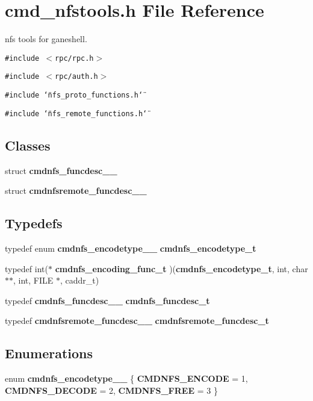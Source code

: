 \section{cmd\_\-nfstools.h File Reference}
\label{cmd__nfstools_8h}
nfs tools for ganeshell. 

{\tt \#include $<$rpc/rpc.h$>$}\par
{\tt \#include $<$rpc/auth.h$>$}\par
{\tt \#include \char`\"{}nfs\_\-proto\_\-functions.h\char`\"{}}\par
{\tt \#include \char`\"{}nfs\_\-remote\_\-functions.h\char`\"{}}\par
\subsection*{Classes}
\begin{CompactItemize}
\item 
struct {\bf cmdnfs\_\-funcdesc\_\-\_\-}
\item 
struct {\bf cmdnfsremote\_\-funcdesc\_\-\_\-}
\end{CompactItemize}
\subsection*{Typedefs}
\begin{CompactItemize}
\item 
typedef enum {\bf cmdnfs\_\-encodetype\_\-\_\-} {\bf cmdnfs\_\-encodetype\_\-t}
\item 
typedef int($\ast$ {\bf cmdnfs\_\-encoding\_\-func\_\-t} )({\bf cmdnfs\_\-encodetype\_\-t}, int, char $\ast$$\ast$, int, FILE $\ast$, caddr\_\-t)
\item 
typedef {\bf cmdnfs\_\-funcdesc\_\-\_\-} {\bf cmdnfs\_\-funcdesc\_\-t}
\item 
typedef {\bf cmdnfsremote\_\-funcdesc\_\-\_\-} {\bf cmdnfsremote\_\-funcdesc\_\-t}
\end{CompactItemize}
\subsection*{Enumerations}
\begin{CompactItemize}
\item 
enum {\bf cmdnfs\_\-encodetype\_\-\_\-} \{ {\bf CMDNFS\_\-ENCODE} =  1, 
{\bf CMDNFS\_\-DECODE} =  2, 
{\bf CMDNFS\_\-FREE} =  3
 \}
\end{CompactItemize}
